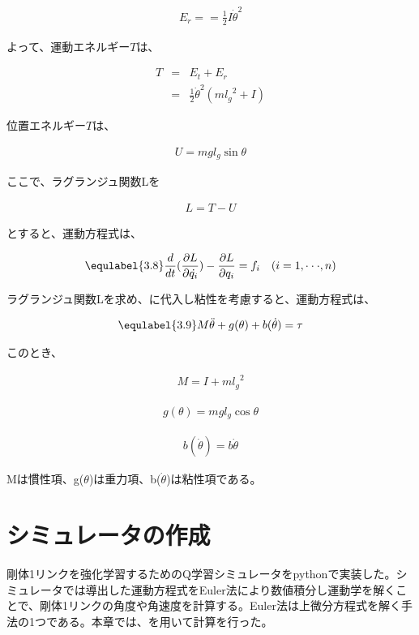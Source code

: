 \begin{eqnarray}
  E_{r} =
  =\frac{1}{2}I{\dot{\theta}}^2
\end{eqnarray}

よって、運動エネルギー$T$は、

\begin{eqnarray}
  T
  &=&E_{t} + E_{r} \nonumber \\
  &=&\frac{1}{2}{\dot{\theta}}^2(m{l_{g}}^2 + I)
\end{eqnarray}

位置エネルギー$T$は、

\begin{eqnarray}
  U
  = mgl_{g}\sin\theta
\end{eqnarray}

ここで、ラグランジュ関数Lを

\begin{eqnarray}
  L
  =T - U
\end{eqnarray}

とすると、運動方程式は、

\begin{eqnarray}
  \equlabel{3.8}
  \frac{d}{dt}(\frac{\partial L}{\partial \dot{q_{i}}}) - \frac{\partial L}{\partial q_{i}} = f_{i} \quad (i = 1,\cdot\cdot\cdot, n)
\end{eqnarray}

ラグランジュ関数Lを求め、に代入し粘性を考慮すると、運動方程式は、

\begin{eqnarray}
  \equlabel{3.9}
  M\ddot{\theta} + g(\theta) + b(\dot{\theta}) = \tau
\end{eqnarray}

このとき、

\begin{eqnarray}
  M = I + m{l_{g}}^2
\end{eqnarray}

\begin{eqnarray}
  g(\theta) = mgl_{g}\cos\theta
\end{eqnarray}

\begin{eqnarray}
  b(\dot{\theta}) = b\dot{\theta}
\end{eqnarray}

Mは慣性項、g($\theta$)は重力項、b($\dot{\theta}$)は粘性項である。

\section{シミュレータの作成}
剛体1リンクを強化学習するためのQ学習シミュレータをpythonで実装した。シミュレータでは導出した運動方程式をEuler法により数値積分し運動学を解くことで、剛体1リンクの角度や角速度を計算する。Euler法は上微分方程式を解く手法の1つである。本章では、を用いて計算を行った。\\

